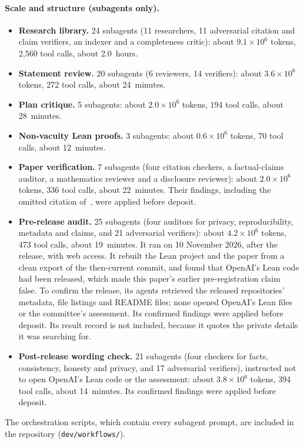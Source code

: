 \documentclass[11pt]{article}
\theoremstyle{definition}
\theoremstyle{remark}
\newcommand{\lean}[1]{\texttt{\hyphenchar\font=-1\relax #1}}
\begin{document}
\paragraph{Scale and structure (subagents only).}
\begin{itemize}[leftmargin=*]
\item \textbf{Research library.} 24 subagents (11 researchers, 11 adversarial citation and claim
  verifiers, an indexer and a completeness critic): about $9.1\times10^6$ tokens, 2{,}560 tool
  calls, about 2.0~hours.
\item \textbf{Statement review.} 20 subagents (6 reviewers, 14 verifiers): about $3.6\times10^6$
  tokens, 272 tool calls, about 24~minutes.
\item \textbf{Plan critique.} 5 subagents: about $2.0\times10^6$ tokens, 194 tool calls, about
  28~minutes.
\item \textbf{Non-vacuity Lean proofs.} 3 subagents: about $0.6\times10^6$ tokens, 70 tool calls,
  about 12~minutes.
\item \textbf{Paper verification.} 7 subagents (four citation checkers, a factual-claims auditor, a
  mathematics reviewer and a disclosure reviewer): about $2.0\times10^6$ tokens, 336 tool calls,
  about 22~minutes. Their findings, including the omitted citation of~\cite{Remondiere2026}, were
  applied before deposit.
\item \textbf{Pre-release audit.} 25 subagents (four auditors for privacy, reproducibility,
  metadata and claims, and 21 adversarial verifiers): about $4.2\times10^6$ tokens, 473 tool calls,
  about 19~minutes. It ran on 10 November 2026, after the release, with web access. It rebuilt the
  Lean project and the paper from a clean export of the then-current commit, and found that OpenAI's
  Lean code had been released, which made this paper's earlier pre-registration claim false. To
  confirm the release, its agents retrieved the released repositories' metadata, file listings and
  README files; none opened OpenAI's Lean files or the committee's assessment. Its confirmed findings
  were applied before deposit. Its result record is not included, because it quotes the private
  details it was searching for.
\item \textbf{Post-release wording check.} 21 subagents (four checkers for facts, consistency,
  honesty and privacy, and 17 adversarial verifiers), instructed not to open OpenAI's Lean code or
  the assessment: about $3.8\times10^6$ tokens, 394 tool calls, about 14~minutes. Its confirmed
  findings were applied before deposit.
\end{itemize}
The orchestration scripts, which contain every subagent prompt, are included in the repository
(\lean{dev/workflows/}).
\end{document}
